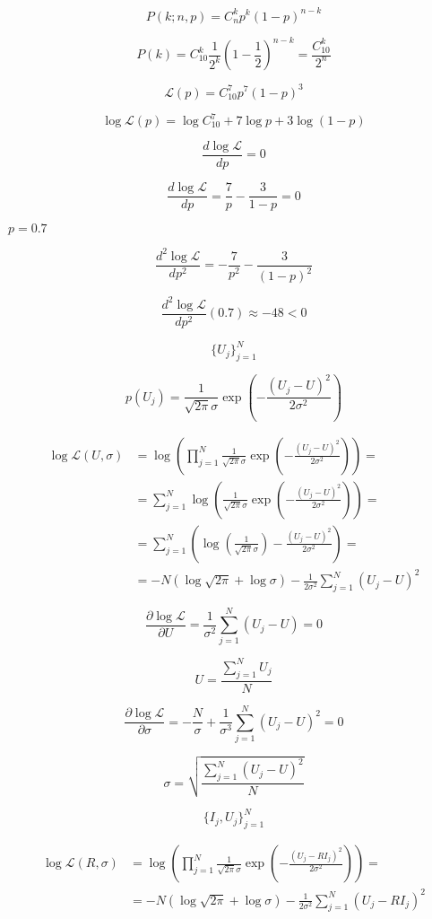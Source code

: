 \documentclass{article}
\begin{document}
$$
P(k;n,p) = C_n^k p^k (1-p)^{n-k}
$$

$$P(k) = C_{10}^k \frac{1}{2^k}\left(1-\frac{1}{2}\right)^{n-k} = \frac{C_{10}^k}{2^n}$$

$$\mathcal{L}(p) = C_{10}^7 p^7 (1-p)^3$$

$$\log \mathcal{L}(p) = \log C_{10}^7 + 7 \log p + 3\log (1-p)$$

$$\frac{d \log \mathcal{L}}{dp} = 0$$

$$\frac{d \log \mathcal{L}}{dp} = \frac{7}{p} - \frac{3}{1-p} = 0$$

$p=0.7$

$$\frac{d^2 \log \mathcal{L}}{dp^2} = -\frac{7}{p^2} - \frac{3}{(1-p)^2}$$

$$\frac{d^2 \log \mathcal{L}}{dp^2}(0.7)  \approx -48 < 0$$

$$
\{U_j\}_{j=1}^{N}
$$

$$
p(U_j) = \frac{1}{\sqrt{2\pi}\sigma} \exp\left(-\frac{(U_j-U)^2}{2\sigma^2}\right)
$$


\begin{align*}
\log \mathcal{L}(U,\sigma) & = \log \left(\prod\limits_{j=1}^N  \frac{1}{\sqrt{2\pi}\sigma} \exp\left(-\frac{(U_j-U)^2}{2\sigma^2}\right)\right) =\\
& = \sum\limits_{j=1}^N \log \left(\frac{1}{\sqrt{2\pi}\sigma} \exp\left(-\frac{(U_j-U)^2}{2\sigma^2}\right)\right) = \\
& = \sum\limits_{j=1}^N \left(\log \left(\frac{1}{\sqrt{2\pi}\sigma}\right) -\frac{(U_j-U)^2}{2\sigma^2}\right) = \\
& = -N \left(\log\sqrt{2\pi} + \log\sigma\right) - \frac{1}{2\sigma^2} \sum\limits_{j=1}^N (U_j-U)^2
\end{align*}


$$
\frac{\partial\log\mathcal{L}}{\partial U}    =  \frac{1}{\sigma^2}\sum\limits_{j=1}^N (U_j-U) = 0 
$$

$$
U = \frac{\sum\limits_{j=1}^N U_j}{N}
$$

$$
\frac{\partial\log\mathcal{L}}{\partial\sigma} =  -\frac{N}{\sigma} + \frac{1}{\sigma^3}\sum\limits_{j=1}^N (U_j-U)^2 = 0
$$

$$
\sigma = \sqrt{\frac{\sum\limits_{j=1}^N (U_j-U)^2}{N}} 
$$

$$
\{I_j, U_j\}_{j=1}^{N}
$$

\begin{align*}
\log \mathcal{L}(R,\sigma) & = \log \left(\prod\limits_{j=1}^N  \frac{1}{\sqrt{2\pi}\sigma} \exp\left(-\frac{(U_j-R I_j)^2}{2\sigma^2}\right)\right) =\\
& = -N \left(\log\sqrt{2\pi} + \log\sigma\right) - \frac{1}{2\sigma^2} \sum\limits_{j=1}^N (U_j- R I_j)^2
\end{align*}
\end{document}
